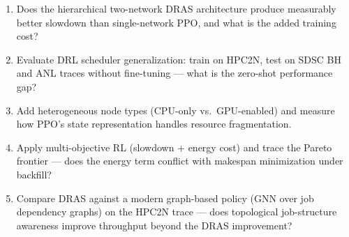\begin{enumerate}[leftmargin=1.6em,itemsep=0.2em,topsep=0.2em,label=Q\arabic*.]
\item Does the hierarchical two-network DRAS architecture produce measurably better slowdown than single-network PPO, and what is the added training cost?
\item Evaluate DRL scheduler generalization: train on HPC2N, test on SDSC BH and ANL traces without fine-tuning --- what is the zero-shot performance gap?
\item Add heterogeneous node types (CPU-only vs.\ GPU-enabled) and measure how PPO's state representation handles resource fragmentation.
\item Apply multi-objective RL (slowdown + energy cost) and trace the Pareto frontier --- does the energy term conflict with makespan minimization under backfill?
\item Compare DRAS against a modern graph-based policy (GNN over job dependency graphs) on the HPC2N trace --- does topological job-structure awareness improve throughput beyond the DRAS improvement?
\end{enumerate}

